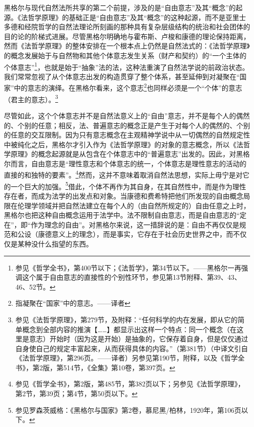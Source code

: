 黑格尔与现代自然法所共享的第二个前提，涉及的是“自由意志”及其“概念”的起源。《法哲学原理》的基础正是“自由意志”及其“概念”的这种起源，而不是亚里士多德和经院哲学的自然法理论所刻画的那种具有复杂层级结构的统治和社会团体的目的论的阶梯式进展。尽管黑格尔明确地与霍布斯、卢梭和康德的理论保持距离，然而《法哲学原理》的整体安排在一个根本点上仍然是自然法式的：《法哲学原理》的概念发展始于与自然物和其他个体意志发生关系（财产和契约）的“一个主体的个体意志”\footnote{参见《哲学全书》，第400节以下；《法哲学》，第34节以下。——黑格尔一再强调这个属于自由意志的直接性的个别性环节，参见第13节附释、第39、43、46、52节。}，也就是始于“抽象”法的法，这种法重演了自然法学说的前政治状态。我们常常忽视了从个体意志出发的构造贯穿了整个体系，甚至延伸到对凝聚在“国家”中的意志的演绎。在黑格尔看来，这个意志\footnote{指凝聚在“国家”中的意志。——译者}也同样必须是一个“个体”的意志（君主的意志）。\footnote{参见《法哲学原理》，第279节，及附释：“任何科学的内在发展，即从它的简单概念到全部内容的推演【……】都显示出这样一个特点：同一个概念（在这里是意志）开始时（因为这是开始）是抽象的，它保存着自身，但是仅仅通过自身使自己的规定丰富起来，从而获得具体的内容。”（第381节）（中译文引自《法哲学原理》，第296页。——译者）另参见第190节，附释，以及《哲学全书》，第2版，第514节，《全集》第10卷，第397页。}

尽管如此，这个个体意志并不是自然法意义上的“自由”意志，并不是每个人的偶然的、个别的任意；相反，法、普遍意志的概念正是产生于对每个人的偶然的、个别的任意的交互限制。因为只有意志概念在主观精神学说中从一切偶然的自然规定性中被纯化之后，黑格尔才引入作为《法哲学原理》的对象的意志概念，所以《法哲学原理》的概念起源就是从包含在个体意志中的“普遍意志”出发的。因此，对黑格尔而言，自由意志是“理性意志和个体意志的统一，个体意志是理性意志的活动的直接的和独特的要素”。\footnote{参见《哲学全书》，第2版，第485节，第382页以下；另参见《法哲学原理》，第2节，第39页；第4节，第50页以下。}然而，这并不意味着取消自然法思想，实际上毋宁是对它的一个巨大的加强。\footnote{参见罗森茨威格：《黑格尔与国家》第2卷，慕尼黑/柏林，1920年，第106页以下。}借此，个体不再作为其自身，在其自然性中，而是作为理性存在者，而成为法学的出发点和对象。当康德和费希特把他们所发现的自由概念局限在伦理学领域并把自然法建立在每个人的（由自然所规定的）自由任意之上时，黑格尔也把这种自由概念运用于法学中。法不限制自由意志，而是自由意志的“定在”，即“作为理念的自由”。对黑格尔来说，这一措辞说的是：自由不再仅仅是规范和公设（康德意义上的理念），而是事实，它存在于社会历史世界之中，而不仅仅是某种没什么指望的东西。


